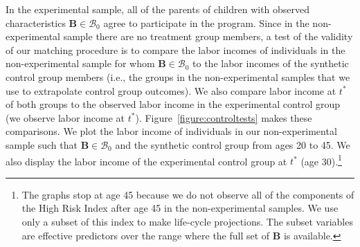 \begin{figure}
\end{figure}

In the experimental sample, all of the parents of children with observed characteristics $\bm{B} \in \mathcal{B}_0$ agree to participate in the program. Since in the non-experimental sample there are no treatment group members, a test of the validity of our matching procedure is to compare the labor incomes of individuals in the non-experimental sample for whom $\bm{B} \in \mathcal{B}_0$ to the labor incomes of the synthetic control group members (i.e., the groups in the non-experimental samples that we use to extrapolate control group outcomes). We also compare labor income at $t^*$ of both groups to the observed labor income in the experimental control group (we observe labor income at $t^*$). Figure~\ref{figure:controltests} makes these comparisons. We plot the labor income of individuals in our non-experimental sample such that $\bm{B} \in \mathcal{B}_0$ and the synthetic control group from ages 20 to 45. We also display the labor income of the experimental control group at $t^*$ (age 30).\footnote{The graphs stop at age 45 because we do not observe all of the components of the High Risk Index after age 45 in the non-experimental samples. We use only a subset of this index to make life-cycle projections. The subset variables are effective predictors over the range where the full set of $\bm{B}$ is available.}

